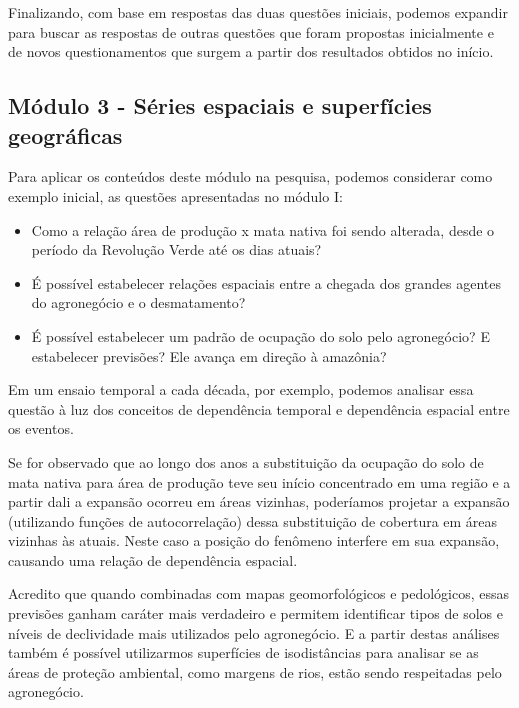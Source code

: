Finalizando, com base em respostas das duas questões iniciais, podemos expandir para buscar as respostas de outras questões que foram propostas inicialmente e de novos questionamentos que surgem a partir dos resultados obtidos no início.

\subsection{Módulo 3 - Séries espaciais e superfícies geográficas}

Para aplicar os conteúdos deste módulo na pesquisa, podemos considerar como exemplo inicial, as questões apresentadas no módulo I:

\begin{itemize}
  \item Como a relação área de produção x mata nativa foi sendo alterada, desde o período da Revolução Verde até os dias atuais?
  \item É possível estabelecer relações espaciais entre a chegada dos grandes agentes do agronegócio e o desmatamento?
  \item É possível estabelecer um padrão de ocupação do solo pelo agronegócio? E estabelecer previsões? Ele avança em direção à amazônia?
\end{itemize}

Em um ensaio temporal a cada década, por exemplo, podemos analisar essa questão à luz dos conceitos de dependência temporal e dependência espacial entre os eventos.

Se for observado que ao longo dos anos a substituição da ocupação do solo de mata nativa para área de produção teve seu início concentrado em uma região e a partir dali a expansão ocorreu em áreas vizinhas, poderíamos projetar a expansão (utilizando funções de autocorrelação) dessa substituição de cobertura em áreas vizinhas às atuais. Neste caso a posição do fenômeno interfere em sua expansão, causando uma relação de dependência espacial.

Acredito que quando combinadas com mapas geomorfológicos e pedológicos, essas previsões ganham caráter mais verdadeiro e permitem identificar tipos de solos e níveis de declividade mais utilizados pelo agronegócio. E a partir destas análises também é possível utilizarmos superfícies de isodistâncias para analisar se as áreas de proteção ambiental, como margens de rios, estão sendo respeitadas pelo agronegócio.




